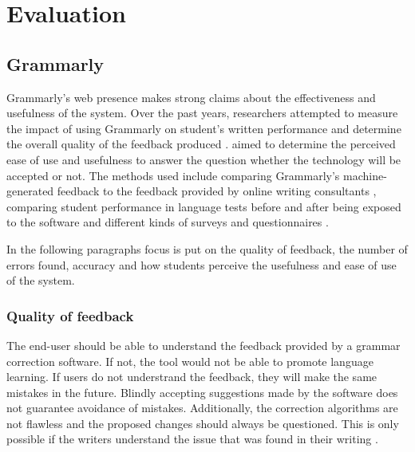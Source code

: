 \documentclass[runningheads]{llncs}
\let\OldTextregistered\textregistered
\renewcommand{\textregistered}{\OldTextregistered\xspace}
\begin{document}
\section{Evaluation}

\subsection{Grammarly\textregistered}
Grammarly\textregistered's web presence \citep{noauthor_grammarly_nodate} makes strong claims about the effectiveness and usefulness of the system. Over the past years, researchers attempted to measure the impact of using Grammarly\textregistered on student's written performance and determine the overall quality of the feedback produced \citep{dembsey_closing_2017,nova_utilizing_2018,ventayen_graduate_2018}. \textcite{cavaleri_you_2016} aimed to determine the perceived ease of use and usefulness to answer the question whether the technology will be accepted or not. The methods used include comparing Grammarly\textregistered's machine-generated feedback to the feedback provided by online writing consultants \citep{dembsey_closing_2017}, comparing student performance in language tests before and after being exposed to the software \citep{qassemzadeh_impact_2016} and different kinds of surveys and questionnaires \citep{nova_utilizing_2018, cavaleri_you_2016, ventayen_graduate_2018}.

In the following paragraphs focus is put on the quality of feedback, the number of errors found, accuracy and how students perceive the usefulness and ease of use of the system.

\subsubsection{Quality of feedback}
The end-user should be able to understand the feedback provided by a grammar correction software. If not, the tool would not be able to promote language learning. If users do not understrand the feedback, they will make the same mistakes in the future. Blindly accepting suggestions made by the software does not guarantee avoidance of mistakes. Additionally, the correction algorithms are not flawless and the proposed changes should always be questioned. This is only possible if the writers understand the issue that was found in their writing \citep{dembsey_closing_2017}.
\end{document}
